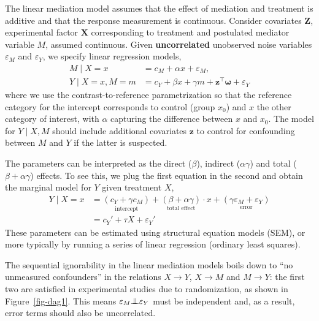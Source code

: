 \documentclass[
  11pt,
  letterpaper,
]{scrbook}
\theoremstyle{definition}
\theoremstyle{remark}
\begin{document}
The linear mediation model assumes that the effect of mediation and
treatment is additive and that the response measurement is continuous.
Consider covariates \(\mathbf{Z}\), experimental factor \(\mathbf{X}\)
corresponding to treatment and postulated mediator variable \(M\),
assumed continuous. Given \textbf{uncorrelated} unobserved noise
variables \(\varepsilon_M\) and \(\varepsilon_Y\), we specify linear
regression models, \begin{align*}
M \mid X=x &= c_M + \alpha x + \varepsilon_M,\\
Y \mid X=x, M=m &=  c_Y + \beta x + \gamma m + \mathbf{z}^\top\boldsymbol{\omega} + \varepsilon_Y
\end{align*} where we use the contrast-to-reference parametrization so
that the reference category for the intercept corresponds to control
(group \(x_0\)) and \(x\) the other category of interest, with
\(\alpha\) capturing the difference between \(x\) and \(x_0\). The model
for \(Y \mid X, M\) should include additional covariates \(\mathbf{z}\)
to control for confounding between \(M\) and \(Y\) if the latter is
suspected.

The parameters can be interpreted as the direct (\(\beta\)), indirect
(\(\alpha \gamma\)) and total (\(\beta + \alpha \gamma\)) effects. To
see this, we plug the first equation in the second and obtain the
marginal model for \(Y\) given treatment \(X\), \begin{align}
Y \mid X=x &= \underset{\text{intercept}}{(c_Y + \gamma c_M)} + \underset{\text{total effect}}{(\beta + \alpha\gamma)}\cdot x + \underset{\text{error}}{(\gamma \varepsilon_M + \varepsilon_Y)}\\
&= c_Y' + \tau X + \varepsilon_Y'
\end{align} These parameters can be estimated using structural equation
models (SEM), or more typically by running a series of linear regression
(ordinary least squares).

The sequential ignorability in the linear mediation models boils down to
``no unmeasured confounders'' in the relations \(X \to Y\), \(X \to M\)
and \(M \to Y\): the first two are satisfied in experimental studies due
to randomization, as shown in Figure~\ref{fig-dag1}. This means
\(\varepsilon_M {\perp\mkern-10mu\perp} \varepsilon_Y\) must be
independent and, as a result, error terms should also be uncorrelated.
\end{document}

